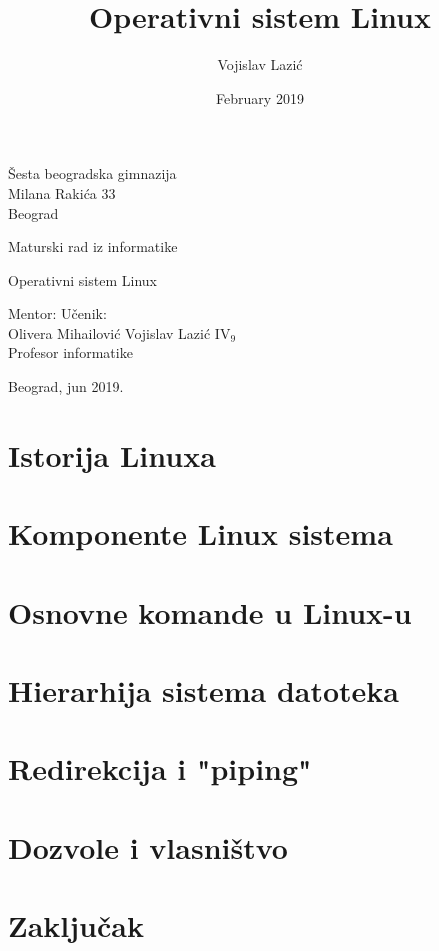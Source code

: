 \documentclass[12pt,twoside,a4paper]{article}
\title{Operativni sistem Linux}
\author{Vojislav Lazić}
\date{February 2019}
\begin{document}
    \thispagestyle{empty}
    \noindent
    Šesta beogradska gimnazija\\
    Milana Rakića 33\\
    Beograd
    \vfill
    \begin{center}
        \begin{Large}
        Maturski rad iz informatike\\
        \bigskip 
        \end{Large}
        {\Huge
        Operativni sistem Linux}
    \end{center}
    \vfill
    \noindent Mentor: \hfill Učenik:\\
    Olivera Mihailović \hfill Vojislav Lazić IV$_{9}$\\
    Profesor informatike
    \vfill
    \begin{center}
        Beograd, jun 2019.
    \end{center}
\thispagestyle{empty}
\newpage
\renewcommand{\contentsname}{Sadržaj}
\tableofcontents
\newpage
\section{Istorija Linuxa}

\newpage
\section{Komponente Linux sistema}

\newpage
\section{Osnovne komande u Linux-u}

\newpage
\section{Hierarhija sistema datoteka}

\newpage
\section{Redirekcija i "piping"}

\newpage
\section{Dozvole i vlasništvo}

\newpage
\section{Zaključak}


\nocite{linfo}
\nocite{tldp}
\newpage
\renewcommand\refname{Literatura}


\newpage

\end{document}
